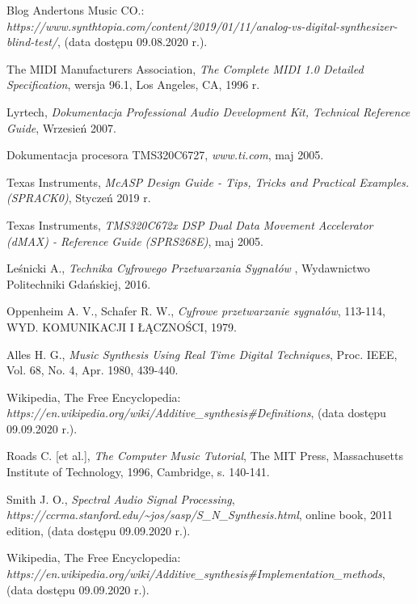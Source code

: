 \documentclass[nostrict]{szablonPG}
\begin{document}
\begin{thebibliography}{20}
		Blog Andertons Music CO.: \emph{https://www.synthtopia.com/content/2019/01/11/analog-vs-digital-synthesizer-blind-test/}, (data dostępu 09.08.2020 r.).
	
		The MIDI Manufacturers Association, \emph{The Complete MIDI 1.0 Detailed Specification}, wersja 96.1, Los Angeles, CA, 1996 r.
		
		Lyrtech, \emph{Dokumentacja Professional Audio Development Kit, Technical Reference Guide}, Wrzesień 2007.
		
		Dokumentacja procesora TMS320C6727, \emph{www.ti.com}, maj 2005.
		
	    Texas Instruments, \emph{McASP Design Guide - Tips, Tricks and Practical Examples. (SPRACK0)}, Styczeń 2019 r.
		
		Texas Instruments, \emph{TMS320C672x DSP Dual Data Movement Accelerator (dMAX) - Reference Guide (SPRS268E)}, maj 2005.
		
		Le\'snicki A., \emph{Technika Cyfrowego Przetwarzania Sygna\l{}\'ow }, Wydawnictwo Politechniki Gda\'nskiej, 2016.
		
		Oppenheim A. V., Schafer R. W., \emph{Cyfrowe przetwarzanie sygnałów}, 113-114, WYD. KOMUNIKACJI I ŁĄCZNOŚCI, 1979.
		
		Alles H. G., \emph{Music Synthesis Using Real Time Digital Techniques}, Proc. IEEE, Vol. 68, No. 4, Apr. 1980, 439-440.

		Wikipedia, The Free Encyclopedia: \emph{https://en.wikipedia.org/wiki/Additive\_synthesis\#Definitions}, (data dostępu 09.09.2020 r.).
		
		Roads C. [et al.], \emph{The Computer Music Tutorial}, The MIT Press, Massachusetts Institute of Technology, 1996, Cambridge, s. 140-141.
		
		Smith J. O., \emph{Spectral Audio Signal Processing}, \emph{https://ccrma.stanford.edu/\textasciitilde jos/sasp/S\_N\_Synthesis.html}, online book, 2011 edition, (data dostępu 09.09.2020 r.).
		
		Wikipedia, The Free Encyclopedia:
		\emph{https://en.wikipedia.org/wiki/Additive\_synthesis\#Implementation\_methods}, (data dostępu 09.09.2020 r.).
		

\end{thebibliography}
\end{document}
